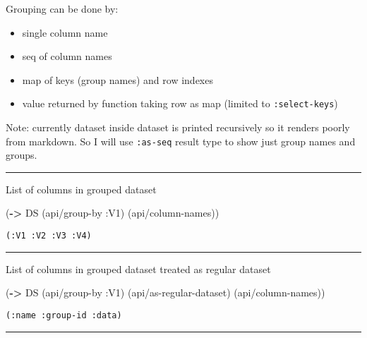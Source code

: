 \documentclass[]{article}
\newenvironment{Shaded}{\begin{snugshade}}{\end{snugshade}}
\newcommand{\AttributeTok}[1]{\textcolor[rgb]{0.77,0.63,0.00}{#1}}
\newcommand{\KeywordTok}[1]{\textcolor[rgb]{0.13,0.29,0.53}{\textbf{#1}}}
\newcommand{\NormalTok}[1]{#1}
\providecommand{\tightlist}{%
  \setlength{\itemsep}{0pt}\setlength{\parskip}{0pt}}
\begin{document}
Grouping can be done by:

\begin{itemize}
\tightlist
\item
  single column name
\item
  seq of column names
\item
  map of keys (group names) and row indexes
\item
  value returned by function taking row as map (limited to
  \texttt{:select-keys})
\end{itemize}

Note: currently dataset inside dataset is printed recursively so it
renders poorly from markdown. So I will use \texttt{:as-seq} result type
to show just group names and groups.

\begin{center}\rule{0.5\linewidth}{0.5pt}\end{center}

List of columns in grouped dataset

\begin{Shaded}
\begin{Highlighting}[]
\NormalTok{(}\KeywordTok{->}\NormalTok{ DS}
\NormalTok{    (api/group-by }\AttributeTok{:V1}\NormalTok{)}
\NormalTok{    (api/column-names))}
\end{Highlighting}
\end{Shaded}

\begin{verbatim}
(:V1 :V2 :V3 :V4)
\end{verbatim}

\begin{center}\rule{0.5\linewidth}{0.5pt}\end{center}

List of columns in grouped dataset treated as regular dataset

\begin{Shaded}
\begin{Highlighting}[]
\NormalTok{(}\KeywordTok{->}\NormalTok{ DS}
\NormalTok{    (api/group-by }\AttributeTok{:V1}\NormalTok{)}
\NormalTok{    (api/as-regular-dataset)}
\NormalTok{    (api/column-names))}
\end{Highlighting}
\end{Shaded}

\begin{verbatim}
(:name :group-id :data)
\end{verbatim}

\begin{center}\rule{0.5\linewidth}{0.5pt}\end{center}
\end{document}

